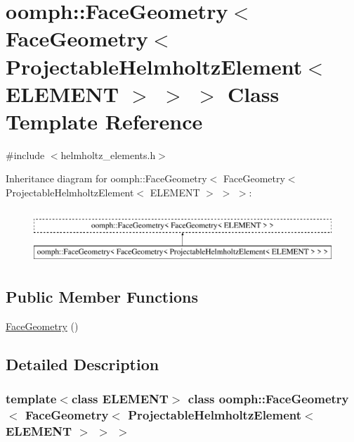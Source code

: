\hypertarget{classoomph_1_1FaceGeometry_3_01FaceGeometry_3_01ProjectableHelmholtzElement_3_01ELEMENT_01_4_01_4_01_4}{}\section{oomph\+:\+:Face\+Geometry$<$ Face\+Geometry$<$ Projectable\+Helmholtz\+Element$<$ E\+L\+E\+M\+E\+NT $>$ $>$ $>$ Class Template Reference}
\label{classoomph_1_1FaceGeometry_3_01FaceGeometry_3_01ProjectableHelmholtzElement_3_01ELEMENT_01_4_01_4_01_4}


{\ttfamily \#include $<$helmholtz\+\_\+elements.\+h$>$}

Inheritance diagram for oomph\+:\+:Face\+Geometry$<$ Face\+Geometry$<$ Projectable\+Helmholtz\+Element$<$ E\+L\+E\+M\+E\+NT $>$ $>$ $>$\+:\begin{figure}[H]
\begin{center}
\leavevmode
\includegraphics[height=2.000000cm]{classoomph_1_1FaceGeometry_3_01FaceGeometry_3_01ProjectableHelmholtzElement_3_01ELEMENT_01_4_01_4_01_4}
\end{center}
\end{figure}
\subsection*{Public Member Functions}
\begin{DoxyCompactItemize}
\item 
\hyperlink{classoomph_1_1FaceGeometry_3_01FaceGeometry_3_01ProjectableHelmholtzElement_3_01ELEMENT_01_4_01_4_01_4_a1c18512b25c22baad12b1789767a7ce5}{Face\+Geometry} ()
\end{DoxyCompactItemize}


\subsection{Detailed Description}
\subsubsection*{template$<$class E\+L\+E\+M\+E\+NT$>$\newline
class oomph\+::\+Face\+Geometry$<$ Face\+Geometry$<$ Projectable\+Helmholtz\+Element$<$ E\+L\+E\+M\+E\+N\+T $>$ $>$ $>$}

